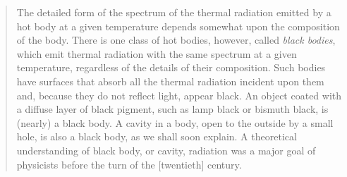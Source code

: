 \begin{quotation}
The detailed form of the spectrum of the thermal radiation emitted by a
hot body at a given temperature depends somewhat upon the composition of
the body. There is one class of hot bodies, however, called \emph{black
bodies}, which emit thermal radiation with the same spectrum at a given
temperature, regardless of the details of their composition. Such bodies
have surfaces that absorb all the thermal radiation incident upon them
and, because they do not reflect light, appear black. An object coated
with a diffuse layer of black pigment, such as lamp black or bismuth
black, is (nearly) a black body. A cavity in a body, open to the outside
by a small hole, is also a black body, as we shall soon explain. A
theoretical understanding of black body, or cavity, radiation was a
major goal of physicists before the turn of the {[}twentieth{]} century.


\end{quotation}
